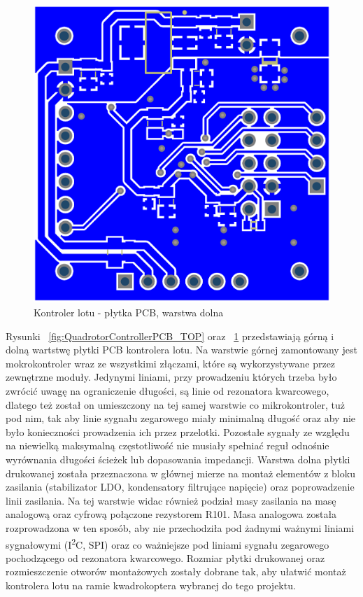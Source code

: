 \begin{figure}[H]
	\centering
	\includegraphics[scale=0.24]{Pictures/QuadrotorControllerPCB_Bottom.png}
		\caption[Kontroler lotu - płytka PCB, warstrwa dolna]{Kontroler lotu - płytka PCB, warstwa dolna}
	\label{fig:QuadrotorControllerPCB_Bottom}
\end{figure}

Rysunki ~\ref{fig:QuadrotorControllerPCB_TOP} oraz ~\ref{fig:QuadrotorControllerPCB_Bottom} przedstawiają górną i dolną wartstwę płytki PCB kontrolera lotu. Na warstwie górnej zamontowany jest mokrokontroler wraz ze wszystkimi złączami, które są wykorzystywane przez zewnętrzne moduły. Jedynymi liniami, przy prowadzeniu których trzeba było zwrócić uwagę na ograniczenie długości, są linie od rezonatora kwarcowego, dlatego też został on umieszczony na tej samej warstwie co mikrokontroler, tuż pod nim, tak aby linie sygnału zegarowego miały minimalną długość oraz aby nie było konieczności prowadzenia ich przez przelotki. Pozostałe sygnały ze względu na niewielką maksymalną częstotliwość nie musiały spełniać reguł odnośnie wyrównania długości ścieżek lub dopasowania impedancji. Warstwa dolna płytki drukowanej została przeznaczona w głównej mierze na montaż elementów z bloku zasilania (stabilizator LDO, kondensatory filtrujące napięcie) oraz poprowadzenie linii zasilania. Na tej warstwie widac również podział masy zasilania na masę analogową oraz cyfrową połączone rezystorem R101. Masa analogowa została rozprowadzona w ten sposób, aby nie przechodziła pod żadnymi ważnymi liniami sygnałowymi (I\textsuperscript{2}C, SPI) oraz co ważniejsze pod liniami sygnału zegarowego pochodzącego od rezonatora kwarcowego. Rozmiar płytki drukowanej oraz rozmieszczenie otworów montażowych zostały dobrane tak, aby ułatwić montaż kontrolera lotu na ramie kwadrokoptera wybranej do tego projektu.

